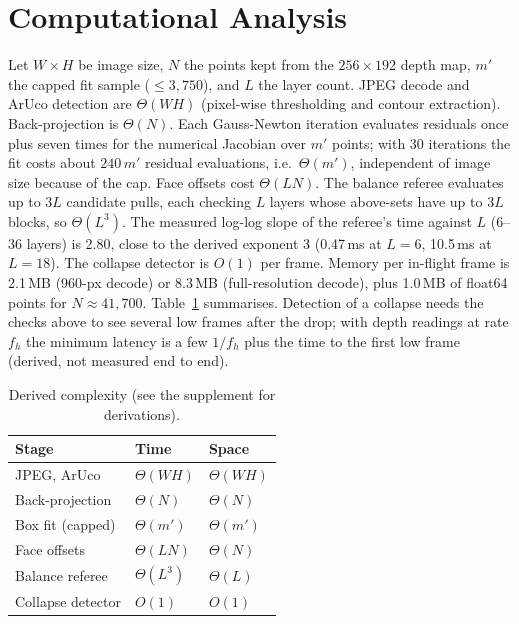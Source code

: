 \documentclass[conference,10pt]{IEEEtran}
\begin{document}
\section{Computational Analysis}
Let $W{\times}H$ be image size, $N$ the points kept from the $256{\times}192$ depth map, $m'$ the capped fit sample ($\le3{,}750$), and $L$ the layer count. JPEG decode and ArUco detection are $\Theta(WH)$ (pixel-wise thresholding and contour extraction). Back-projection is $\Theta(N)$. Each Gauss-Newton iteration evaluates residuals once plus seven times for the numerical Jacobian over $m'$ points; with 30 iterations the fit costs about $240\,m'$ residual evaluations, i.e.\ $\Theta(m')$, independent of image size because of the cap. Face offsets cost $\Theta(LN)$. The balance referee evaluates up to $3L$ candidate pulls, each checking $L$ layers whose above-sets have up to $3L$ blocks, so $\Theta(L^3)$. The measured log-log slope of the referee's time against $L$ (6--36 layers) is 2.80, close to the derived exponent 3 (0.47\,ms at $L=6$, 10.5\,ms at $L=18$). The collapse detector is $O(1)$ per frame. Memory per in-flight frame is 2.1\,MB (960-px decode) or 8.3\,MB (full-resolution decode), plus 1.0\,MB of float64 points for $N\approx41{,}700$. Table~\ref{tab:cx} summarises. Detection of a collapse needs the checks above to see several low frames after the drop; with depth readings at rate $f_h$ the minimum latency is a few $1/f_h$ plus the time to the first low frame (derived, not measured end to end).
\begin{table}[t]
\caption{Derived complexity (see the supplement for derivations).}\label{tab:cx}
\centering\footnotesize
\begin{tabular}{@{}lll@{}}
\toprule
Stage & Time & Space \\
\midrule
JPEG, ArUco & $\Theta(WH)$ & $\Theta(WH)$ \\
Back-projection & $\Theta(N)$ & $\Theta(N)$ \\
Box fit (capped) & $\Theta(m')$ & $\Theta(m')$ \\
Face offsets & $\Theta(LN)$ & $\Theta(N)$ \\
Balance referee & $\Theta(L^3)$ & $\Theta(L)$ \\
Collapse detector & $O(1)$ & $O(1)$ \\
\bottomrule
\end{tabular}
\end{table}
\end{document}

